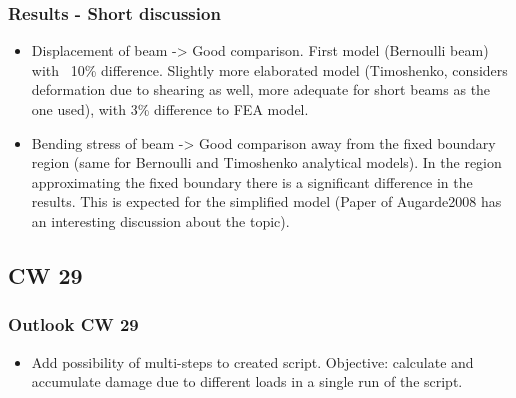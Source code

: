\begin{frame}
  \frametitle{Results - Short discussion}
	\begin{itemize}
		\item Displacement of beam -> Good comparison. First model (Bernoulli beam) with ~10\% difference. Slightly more elaborated model (Timoshenko, considers deformation due to shearing as well, more adequate for short beams as the one used), with 3\% difference to FEA model.
		\item Bending stress of beam -> Good comparison away from the fixed boundary region (same for Bernoulli and Timoshenko analytical models). In the region approximating the fixed boundary there is a significant difference in the results. This is expected for the simplified model (Paper of Augarde2008 has an interesting discussion about the topic).
	\end{itemize}
\end{frame}

\subsection{CW 29}
\begin{frame}
  \frametitle{Outlook CW 29}
	\begin{itemize}
		\item Add possibility of multi-steps to created script. Objective: calculate and accumulate damage due to different loads in a single run of the script.
	\end{itemize}
\end{frame}

